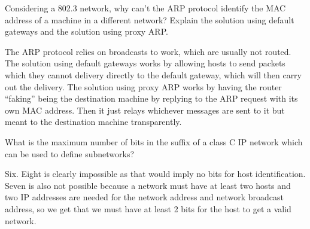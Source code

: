 \begin{Exercise}
Considering a 802.3 network, why can't the ARP protocol identify the MAC address of a machine in a different network?
Explain the solution using default gateways and the solution using proxy ARP.
\end{Exercise}
\begin{Answer}
The ARP protocol relies on broadcasts to work, which are usually not routed.
The solution using default gateways works by allowing hosts to send packets which they cannot delivery directly to the default gateway, which will then carry out the delivery.
The solution using proxy ARP works by having the router ``faking'' being the destination machine by replying to the ARP request with its own MAC address. Then it just relays whichever messages are sent to it but meant to the destination machine transparently.
\end{Answer}

\begin{Exercise}
What is the maximum number of bits in the suffix of a class C IP network which can be used to define subnetworks?
\end{Exercise}
\begin{Answer}
Six.
Eight is clearly impossible as that would imply no bits for host identification.
Seven is also not possible because a network must have at least two hosts and two IP addresses are needed for the network address and network broadcast address, so we get that we must have at least 2 bits for the host to get a valid network.
\end{Answer}

